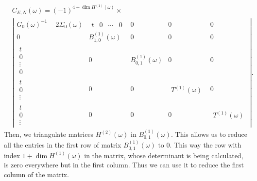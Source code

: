 \documentclass{article}
\begin{document}
\begin{equation}
\begin{split}
    &C_{E,N}(\omega) = (-1)^{4 + \dim H^{(1)}(\omega)} \times\\ 
    &\left\vert
    \begin{array}{c|c|c|c|c}
        G_0(\omega)^{-1} - 2\Sigma_0(\omega) & 
            \begin{array}{cccc} t & 0 & \cdots & 0 \end{array} & 
            0 & 0 & 0 \\
        \hline
        0 & B^{(1)}_{1,0}(\omega) & 0 & 0 & 0 \\
        \hline
        \begin{array}{c} t \\ 0 \\ \vdots \\ 0 \end{array} & 
            0 & B^{(1)}_{0,1}(\omega) & 0 & 0 \\
        \hline
        \begin{array}{c} t \\ 0 \\ \vdots \end{array} & 
            0 & 0 &\begin{array}{c} T^{(1)}(\omega) \end{array} & 0 \\
        \hline
        \begin{array}{c} t \\ 0 \\ \vdots \end{array} & 
            0 & 0 & 0 & \begin{array}{c} T^{(1)}(\omega) \end{array}
    \end{array}
    \right\vert.
\end{split}
\end{equation}
Then, we triangulate matrices $H^{(2)}(\omega)$ in $B^{(1)}_{0,1}(\omega)$. This allows us to reduce all the entries in the first row of matrix $B^{(1)}_{0,1}(\omega)$ to 0. This way the row with index $1 + \dim H^{(1)}(\omega)$ in the matrix, whose determinant is being calculated, is zero everywhere but in the first column. Thus we can use it to reduce the first column of the matrix.
\end{document}
